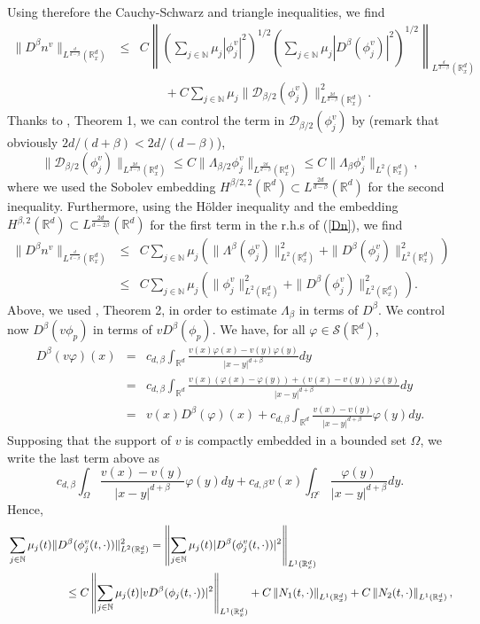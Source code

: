 \documentclass[12pt]{article}
\def \Rm {\mathbb R}
\def \Nm {\mathbb N}
\newcommand{\calS}{\mathcal S}
\newcommand{\calD}{\mathcal D}
\def\fref#1{{\rm (\ref{#1})}}
\newcommand{\bea}{\begin{eqnarray}}
\newcommand{\eea}{\end{eqnarray}}
\newcommand{\bee}{\begin{eqnarray*}}
\newcommand{\eee}{\end{eqnarray*}}
\begin{document}
Using therefore the Cauchy-Schwarz and triangle inequalities, we find
\bea \nonumber
\|D^\beta n^v\|_{L^{\frac{d}{d-\beta}}(\Rm_x^d)}&\leq& C \left\| \left(\sum_{j\in \Nm} \mu_j |\phi^v_j|^2\right)^{1/2}\left(\sum_{j\in \Nm} \mu_j |D^\beta(\phi^v_j)|^2\right)^{1/2} \right\|_{L^{\frac{d}{d-\beta}}(\Rm^d_x)}\\
&& \qquad +C \sum_{j\in \Nm} \mu_j\big\|\calD_{\beta/2}(\phi_j^v) \big\|_{L^{\frac{2d}{d-\beta}}(\Rm^d_x)}^2. \label{Dn}
\eea
Thanks to \cite{stein1}, Theorem 1, we can control the term in $\calD_{\beta/2}(\phi_j^v)$ by (remark that obviously $2d/(d+\beta)<2d/(d-\beta)$),
$$
\|\calD_{\beta/2}(\phi_j^v) \big\|_{L^{\frac{2d}{d-\beta}}(\Rm^d_x)} \leq C \|\Lambda_{\beta/2} \phi_j^v\|_{L^{\frac{2d}{d-\beta}}(\Rm^d_x)} \leq C \|\Lambda_{\beta} \phi_j^v\|_{L^{2}(\Rm^d_x)},
$$
where we used the Sobolev embedding $H^{\beta/2,2}(\Rm^d) \subset L^{\frac{2d}{d-\beta}}(\Rm^d)$ for the second inequality. Furthermore, using the H\"older inequality and the embedding $H^{\beta,2}(\Rm^d) \subset L^{\frac{2d}{d-2\beta}}(\Rm^d)$ for the first term in the r.h.s of \fref{Dn}, we find
\bee
\|D^\beta n^v\|_{L^{\frac{d}{d-\beta}}(\Rm_x^d)}&\leq& C \sum_{j\in \Nm} \mu_j \left( \|\Lambda^\beta(\phi^v_j)\|^2_{L^2(\Rm_x^d)}+\|D^\beta(\phi^v_j)\|^2_{L^2(\Rm_x^d)}\right)\\
&\leq & C  \sum_{j\in \Nm} \mu_j \left( \|\phi^v_j\|^2_{L^2(\Rm^d_x)}+\|D^\beta(\phi^v_j)\|^2_{L^2(\Rm_x^d)} \right).
\eee
Above, we used \cite{stein1}, Theorem 2, in order to estimate $\Lambda_\beta$ in terms of $D^\beta$. We control now $D^\beta( v \phi_p)$ in terms of $v D^\beta(\phi_p)$. We have, for all $\varphi \in \calS(\Rm^d)$,
\bee
D^\beta(v \varphi)(x)&=&c_{d,\beta} \int_{\Rm^d} \frac{v(x)\varphi(x)-v(y)\varphi(y)}{|x-y|^{d+\beta}}dy\\
&=&c_{d,\beta} \int_{\Rm^d} \frac{v(x)(\varphi(x)-\varphi(y))+(v(x)-v(y))\varphi(y)}{|x-y|^{d+\beta}}dy\\
&=&v(x)D^\beta(\varphi)(x)+c_{d,\beta} \int_{\Rm^d} \frac{v(x)-v(y)}{|x-y|^{d+\beta}}\varphi(y) dy.
\eee
Supposing that the support of $v$ is compactly embedded in a bounded set $\Omega$, we write the last term above as
$$
c_{d,\beta} \int_{\Omega} \frac{v(x)-v(y)}{|x-y|^{d+\beta}}\varphi(y) dy+c_{d,\beta} v(x)\int_{\Omega^c} \frac{\varphi(y)}{|x-y|^{d+\beta}} dy.
$$
Hence,
\begin{align*}
& \sum_{j\in \Nm} \mu_j(t) \|D^\beta(\phi^v_j(t,\cdot))\|^2_{L^2(\Rm^d_x)}=\left\| \sum_{j\in \Nm} \mu_j(t) |D^\beta(\phi^v_j(t,\cdot))|^2 \right\|_{L^1(\Rm^d_x)}\\
&\hspace{1.8cm} \leq C \left\| \sum_{j\in \Nm} \mu_j(t) |v D^\beta(\phi_j(t,\cdot))|^2 \right\|_{L^1(\Rm^d_x)}+C\left\| N_1(t,\cdot) \right\|_{L^1(\Rm^d_x)}+C\left\| N_2(t,\cdot) \right\|_{L^1(\Rm^d_x)},
\end{align*}
\end{document}
